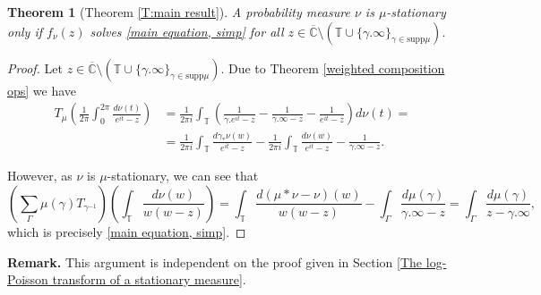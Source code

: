 \documentclass[11pt]{article}
\newtheorem{theorem}{Theorem}[section]
\begin{document}
\begin{theorem}[Theorem \ref{T:main result}]
	\label{T:Cauchy transform solves main eq}
	A probability measure $\nu$ is $\mu$-stationary only if $f_\nu(z)$ solves \eqref{main equation, simp} for all $z \in \overline{\mathbb{C}} \setminus (\mathbb{T} \cup \{\gamma.\infty\}_{\gamma \in \text{supp} \mu} )$.
\end{theorem}
\begin{proof}
	Let $z \in \overline{\mathbb{C}} \setminus (\mathbb{T} \cup \{\gamma.\infty\}_{\gamma \in \text{supp} \mu} )$. Due to Theorem \ref{weighted composition ops} we have
	\[
	\begin{aligned}
		T_\mu \left( \frac{1}{2 \pi} \int_{0}^{2 \pi} \frac{d\nu(t)}{e^{it} -  z} \right) &= \frac{1}{2 \pi i}  \int_{\mathbb{T}} \left(  \frac{1}{\gamma.e^{it} -  z} - \frac{1}{\gamma.\infty - z} - \frac{1}{e^{it} -  z} \right)  d \nu(t) = \\ 
		&= \frac{1}{2 \pi i}  \int_{\mathbb{T}} \frac{d \gamma_* \nu(w)}{e^{it} -  z}  -  \frac{1}{2 \pi i}\int_{\mathbb{T}} \frac{d \nu(w)}{e^{it} -  z}  - \frac{1}{\gamma.\infty - z} .
	\end{aligned}
	\]
	
	However, as $\nu$ is $\mu$-stationary, we can see that
	\[
	\left( \sum_\Gamma \mu(\gamma) T_{\gamma^{-1}} \right) \left(  \int_{\mathbb{T}} \frac{d \nu(w)}{w(w - z)} \right)  = \int_{\mathbb{T}} \frac{d (\mu * \nu - \nu) (w)}{w(w - z)}  - \int_\Gamma \frac{d \mu(\gamma)}{\gamma.\infty - z} = \int_\Gamma \frac{d \mu(\gamma)}{z - \gamma.\infty},
	\]
	which is precisely \eqref{main equation, simp}.
\end{proof}

\textbf{Remark.} This argument is independent on the proof given in Section \ref{The log-Poisson transform of a stationary measure}.
\end{document}
